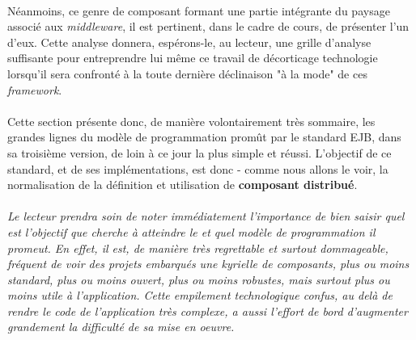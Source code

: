 {   \paragraph{} Néanmoins, ce genre de composant formant une partie intégrante du paysage associé
   aux \textit{middleware}, il est pertinent, dans le cadre de cours, de présenter l'un d'eux. Cette
   analyse donnera, espérons-le, au lecteur, une grille d'analyse suffisante pour entreprendre lui
   même ce travail de décorticage technologie lorsqu'il sera confronté à la toute dernière
   déclinaison "à la mode" de ces \textit{framework}.

   \paragraph{} Cette section présente donc, de manière volontairement très sommaire, les grandes
   lignes du modèle de programmation promût par le standard EJB, dans sa troisième version, de loin
   à ce jour la plus simple et réussi. L'objectif de ce standard, et de ses implémentations, est
   donc - comme nous allons le voir, la normalisation de la définition et utilisation de
   \textbf{composant distribué}.

   \paragraph{} \textit{Le lecteur prendra soin de noter immédiatement l'importance de bien saisir
   quel est l'objectif que cherche à atteindre le  et quel modèle de programmation
   il promeut. En effet, il est, de manière très regrettable et surtout dommageable, fréquent de
   voir des projets embarqués une kyrielle de composants, plus ou moins standard, plus ou moins
   ouvert, plus ou moins robustes, mais surtout plus ou moins utile à l'application. Cette
   empilement technologique confus, au delà de rendre le code de l'application très complexe, a
   aussi l'effort de bord d'augmenter grandement la difficulté de sa mise en oeuvre.}
}




